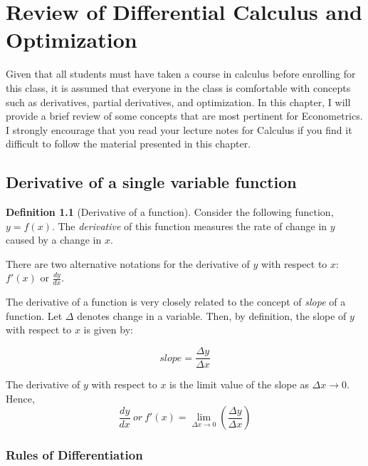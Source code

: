 \documentclass[
]{book}
\theoremstyle{definition}
\newtheorem{definition}{Definition}[chapter]
\theoremstyle{definition}
\theoremstyle{definition}
\theoremstyle{definition}
\theoremstyle{remark}
\begin{document}
\hypertarget{appendix-appendix}{%
\appendix}


\hypertarget{review-of-differential-calculus-and-optimization}{%
\chapter{Review of Differential Calculus and Optimization}\label{review-of-differential-calculus-and-optimization}}

Given that all students must have taken a course in calculus before enrolling for this class, it is assumed that everyone in the class is comfortable with concepts such as derivatives, partial derivatives, and optimization. In this chapter, I will provide a brief review of some concepts that are most pertinent for Econometrics. I strongly encourage that you read your lecture notes for Calculus if you find it difficult to follow the material presented in this chapter.

\hypertarget{derivative-of-a-single-variable-function}{%
\section{Derivative of a single variable function}\label{derivative-of-a-single-variable-function}}

\begin{definition}[Derivative of a function]
\protect\hypertarget{def:unnamed-chunk-47}{}\label{def:unnamed-chunk-47}Consider the following function, \(y=f(x)\). The \emph{derivative} of this function measures the rate of change in \(y\) caused by a change in \(x\).
\end{definition}

There are two alternative notations for the derivative of \(y\) with respect to \(x\): \(f'(x)\) or \(\displaystyle{\frac{dy}{dx}}\).

The derivative of a function is very closely related to the concept of \emph{slope} of a function. Let \(\Delta\) denotes change in a variable. Then, by definition, the slope of \(y\) with respect to \(x\) is given by:

\[slope=\frac{\Delta y}{\Delta x}\]

The derivative of \(y\) with respect to \(x\) is the limit value of the slope as \(\Delta x \rightarrow 0\). Hence,
\[\frac{dy}{dx} \ or \ f'(x)=\lim_{\Delta x \to 0} \left( \frac{\Delta y}{\Delta x}\right) \]

\hypertarget{rules-of-differentiation}{%
\subsection{Rules of Differentiation}\label{rules-of-differentiation}}
\end{document}
